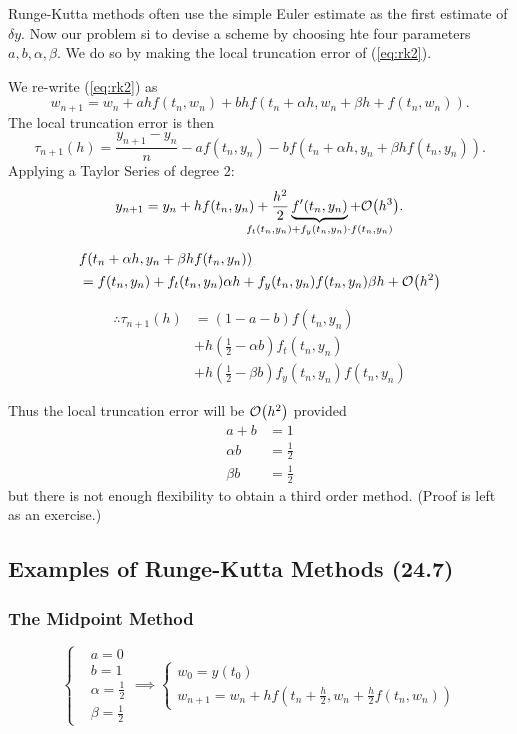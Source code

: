 Runge-Kutta methods often use the simple Euler estimate as the first estimate
of $\delta y$. Now our problem si to devise a scheme by choosing hte four
parameters $a, b, \alpha, \beta$. We do so by making the local truncation error
of (\ref{eq:rk2}).

We re-write (\ref{eq:rk2}) as
\[
  w_{n+1} = w_n + ahf(t_n, w_n) + bhf(t_n+\alpha h, w_n+\beta h + f(t_n, w_n))
.\]
The local truncation error is then
\[
  \tau_{n+1}(h) = \frac{y_{n+1}-y_n}{n} - af(t_n,y_n) - bf(t_n+\alpha h, y_n +
  \beta hf(t_n, y_n))
.\]
Applying a Taylor Series of degree $2$:
\[
  y_{n+1} = y_n + h f(t_n, y_n) + \frac{h^2}{2} 
  \underbrace{f'(t_n, y_n)}_{\mathclap{f_t(t_n, y_n) + f_y(t_n, y_n) \cdot f(t_n, y_n)}} 
  + \order{h^3}.
\]

\begin{align*}
& f(t_n + \alpha h, y_n + \beta h f(t_n,y_n))  \\
&= f(t_n, y_n) + f_t(t_n,y_n) \alpha h + f_y(t_n, y_n) f(t_n,y_n) \beta h + 
\order{h^2} \\
\end{align*}

\begin{align*}
  \therefore \tau_{n+1} (h) &= (1-a-b) f(t_n,y_n) \\
                            &+ h(\frac{1}{2} -\alpha b) f_t(t_n,y_n) \\
                            &+ h(\frac{1}{2} - \beta b) f_y(t_n,y_n) f(t_n,y_n)
\end{align*}

Thus the local truncation error will be $\order{h^2}$ provided 
\begin{align*}
a+b &= 1 \\
\alpha b &= \frac{1}{2} \\
\beta b &= \frac{1}{2}
\end{align*}
but there is not enough flexibility to obtain a third order method. (Proof is
left as an exercise.)

\subsection{Examples of Runge-Kutta Methods (24.7)}
\subsubsection{The Midpoint Method}
\begin{equation*}
  \boxed{\begin{cases}
     & a = 0\\
     & b=1\\
     & \alpha = \frac{1}{2}\\
     & \beta = \frac{1}{2}
    \end{cases}
    \implies 
    \begin{cases}
      w_0 = y(t_0) \\
      w_{n+1} = w_n + h f(t_n + \frac{h}{2}, w_n + \frac{h}{2}f(t_n, w_n)) 
  \end{cases}}
\end{equation*}
